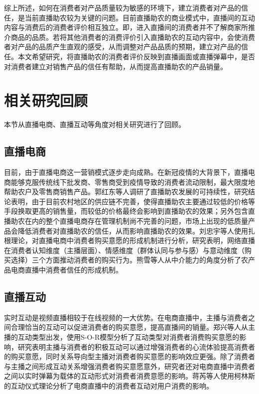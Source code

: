 \documentclass{../notes}
\begin{document}
    综上所述，如何在消费者对产品质量较为敏感的环境下，建立消费者对产品的信任，是当前直播助农较为关键的问题。目前直播助农的商业模式中，直播间的互动内容与消费后的消费者评价相互独立。即，进入直播间的消费者并不了解商家所推介商品的品质。若将其他消费者的消费评价引入直播助农的互动内容中，会使消费者对产品的品质产生直观的感受，从而调整对产品品质的预期，建立对产品的信任。本文希望研究，将直播助农的消费者评价反映到直播画面或直播弹幕中，是否对消费者建立对销售产品的信任有帮助，从而提高直播助农的产品销量。

    \section{相关研究回顾}

    本节从直播电商、直播互动等角度对相关研究进行了回顾。

    \subsection{直播电商}

    目前，由于直播电商这一营销模式逐步走向成熟。在新冠疫情的大背景下，直播电商能够克服传统线下批发商、零售商受到疫情导致的消费者流动限制，最大限度地帮助农户及零售商销售产品。郭红东等人调研了直播助农发展的可持续性，研究结论表明，由于目前农村地区的供应链不完善，使得直播助农主要通过较低的价格等手段换取更高的销售量，而较低的价格最终会影响到直播助农的效果；另外包含直播助农在内的整个直播电商存在管理机制尚不完善的问题，市场上出现的低质量产品会降低消费者对直播助农的信任，从而影响直播助农的效果\cite{guo2020}。刘忠宇等人使用扎根理论，对直播电商中消费者购买意愿的形成机制进行分析，研究表明，网络直播在消费者认知维度（主播层面）、情感维度（群体认同与参与感）与意动维度（购买选择）三个方面推动消费者的购买行为\cite{liu2020}。熊雪等人从中介能力的角度分析了农产品电商直播中消费者信任的形成机制\cite{xiong2020}。

    \subsection{直播互动}

    实时互动是视频直播相较于在线视频的一大优势。在电商直播中，主播与消费者之间合理恰当的互动可以促进消费者的购买意愿，提高直播间的销量。郑兴等人从主播的互动类型出发，使用S-O-R模型分析了互动类型对消费者消费购买意愿的影响，研究表明主播与消费者的积极互动可以通过增强消费者的心流体验提高消费者的购买意愿，同时关系导向型主播对消费者购买意愿的影响效应更强\cite{zheng2019}。除了消费者与主播之间形成互动关系增强消费者购买意愿意外，研究者还对电商直播中消费者之间以实时弹幕为载体的互动形式对消费者消费意愿的影响。蒋芮等人使用柯林斯的互动仪式理论分析了电商直播中的消费者互动对用户消费的影响\cite{jiang2020}。
\end{document}
